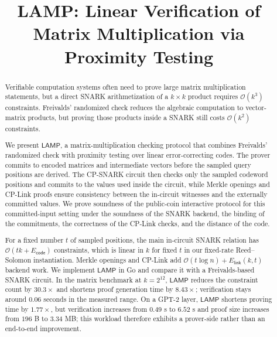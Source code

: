\documentclass[conference,compsoc]{IEEEtran}
\newcommand{\protocol}{\textsf{LAMP}}   %
\theoremstyle{plain}
\theoremstyle{definition}
\theoremstyle{remark}
\providecommand{\DIFaddtex}[1]{{\protect\color{DIFADD} \sf #1}} %
\providecommand{\DIFaddbegin}{} %
\providecommand{\DIFaddend}{} %
\providecommand{\DIFadd}[1]{\texorpdfstring{\DIFaddtex{#1}}{#1}} %
\providecommand{\DIFaddincludegraphics}[2][]{{\color{blue}\fbox{\DIFOincludegraphics[#1]{#2}}}} %
\DeclareRobustCommand{\DIFaddbegin}{\DIFOaddbegin \let\includegraphics\DIFaddincludegraphics} %
\DeclareRobustCommand{\DIFaddend}{\DIFOaddend \let\includegraphics\DIFOincludegraphics} %
\begin{document}
\title{LAMP: Linear Verification of Matrix Multiplication via Proximity Testing}

\author{}

\maketitle

\begin{abstract}
Verifiable computation systems often need to prove large matrix multiplication
statements, but a direct SNARK arithmetization of a \(k \times k\) product
requires \(\mathcal{O}(k^3)\) constraints. Freivalds' randomized check reduces
the algebraic computation to vector-matrix products, but proving those products
inside a SNARK still costs \(\mathcal{O}(k^2)\) constraints.

We present \(\protocol\), a matrix-multiplication checking protocol that combines
Freivalds' randomized check with proximity testing over linear error-correcting
codes. The prover commits to encoded matrices and intermediate vectors before
the sampled query positions are derived. The CP-SNARK circuit then checks only the sampled codeword positions and commits to the values used inside the circuit, while Merkle openings and CP-Link proofs ensure consistency between the in-circuit witnesses and the externally committed values. We prove soundness \DIFaddbegin \DIFadd{of the public-coin interactive protocol }\DIFaddend for this committed-input setting under the soundness of the SNARK backend, the binding of the commitments, the correctness of the CP-Link checks, and the distance of the code.

For a fixed number \(t\) of sampled positions, the main in-circuit SNARK
relation has  \DIFaddbegin \DIFadd{\(\mathcal{O}(tk+E_{\mathsf{code}})\) constraints, which is linear
in \(k\) for fixed \(t\) in our fixed-rate Reed--Solomon instantiation.  }\DIFaddend Merkle
openings and CP-Link  \DIFaddbegin \DIFadd{add
\(\mathcal{O}(t\log n)+E_{\mathsf{link}}(k,t)\) backend work}\DIFaddend . We implement
\(\protocol\) in Go and compare it with a Freivalds-based SNARK circuit. In the
matrix benchmark at \(k=2^{12}\), \(\protocol\) reduces the constraint count by
\(30.3\times\) and shortens proof generation time by  \DIFaddbegin \DIFadd{\(8.43\times\)}\DIFaddend ; verification
stays  \DIFaddbegin \DIFadd{around \(0.06\) }\DIFaddend seconds in the measured range.  \DIFaddbegin \DIFadd{On a GPT-2 layer,
\(\protocol\) shortens proving time by
\(1.77\times\), but verification increases from \(0.49\) s to \(6.52\) s and
proof size increases from \(196\) B to \(3.34\) MB; this workload therefore
exhibits a prover-side rather than an end-to-end improvement.
}\DIFaddend 

\end{abstract}
\end{document}
